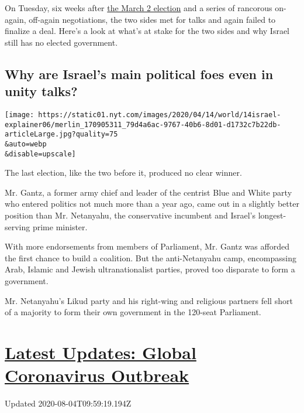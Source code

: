 On Tuesday, six weeks after
\href{https://www.nytimes.com/2020/03/03/world/middleeast/israel-election-takeaways.html}{the
March 2 election} and a series of rancorous on-again, off-again
negotiations, the two sides met for talks and again failed to finalize a
deal. Here's a look at what's at stake for the two sides and why Israel
still has no elected government.

\hypertarget{why-are-israels-main-political-foes-even-in-unity-talks}{%
\subsection{Why are Israel's main political foes even in unity
talks?}\label{why-are-israels-main-political-foes-even-in-unity-talks}}

\texttt{[image: https://static01.nyt.com/images/2020/04/14/world/14israel-explainer06/merlin\_170905311\_79d4a6ac-9767-40b6-8d01-d1732c7b22db-articleLarge.jpg?quality=75\\\&auto=webp\\\&disable=upscale]}

The last election, like the two before it, produced no clear winner.

Mr. Gantz, a former army chief and leader of the centrist Blue and White
party who entered politics not much more than a year ago, came out in a
slightly better position than Mr. Netanyahu, the conservative incumbent
and Israel's longest-serving prime minister.

With more endorsements from members of Parliament, Mr. Gantz was
afforded the first chance to build a coalition. But the anti-Netanyahu
camp, encompassing Arab, Islamic and Jewish ultranationalist parties,
proved too disparate to form a government.

Mr. Netanyahu's Likud party and his right-wing and religious partners
fell short of a majority to form their own government in the 120-seat
Parliament.

\hypertarget{latest-updates-global-coronavirus-outbreak}{%
\section{\texorpdfstring{\href{https://www.nytimes.com/2020/08/04/world/coronavirus-covid-19.html?action=click\&pgtype=Article\&state=default\&region=MAIN_CONTENT_1\&context=storylines_live_updates}{Latest
Updates: Global Coronavirus
Outbreak}}{Latest Updates: Global Coronavirus Outbreak}}\label{latest-updates-global-coronavirus-outbreak}}

Updated 2020-08-04T09:59:19.194Z

